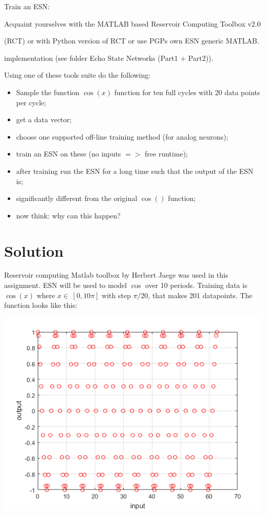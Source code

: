 \documentclass[a4paper, 12pt]{article}
\begin{document}
Train an ESN:

Acquaint yourselves with the MATLAB based Reservoir Computing Toolbox v2.0

(RCT) or with Python version of RCT or use PGPs own ESN generic MATLAB.

implementation (see folder Echo State Networks (Part1 + Part2)).

Using one of these tools suite do the following:
\begin{itemize}
\item Sample the function $\cos(x)$ function for ten full cycles with 20 data points per cycle;
\item get a data vector;
\item choose one supported off-line training method (for analog neurons);
\item train an ESN on these (no inputs $=>$ free runtime);
\item after training run the ESN for a long time such that the output of the ESN is;
\item significantly different from the original $\cos()$ function;
\item now think: why can this happen?
\end{itemize}

\section{Solution}

Reservoir computing Matlab toolbox by Herbert Jaege was used in this assignment. ESN will be used to model $\cos$ over 10 periods. Training data is $\cos(x)$ where $x \in~[0,10\pi]$ with step $\pi/20$, that makes 201 datapoints. The function looks like this:


\begin{center}
\includegraphics[scale=0.6]{traindata.png}
\end{center}
\end{document}
